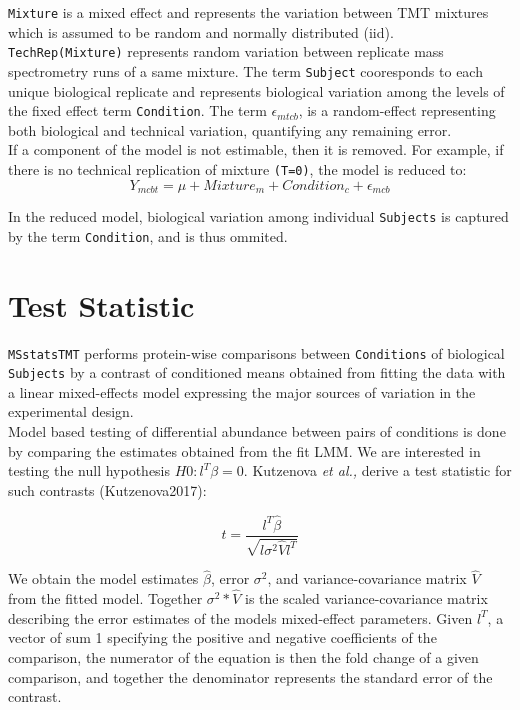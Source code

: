 \documentclass[11pt]{elife}\usepackage[]{graphicx}\usepackage[]{color}
\begin{document}
\texttt{Mixture} is a mixed effect and 
represents the variation between TMT mixtures which is assumed to be random 
and normally distributed (iid). \texttt{TechRep(Mixture)} represents random 
variation between replicate mass spectrometry runs of a same mixture. 
The term \texttt{Subject} cooresponds to each unique biological replicate and 
represents biological variation among the levels of the fixed effect term
\texttt{Condition}. The term $\epsilon_{mtcb}$,
is a random-effect representing both biological and technical variation, 
quantifying any remaining error.\\

If a component of the model is not estimable, then it is removed. 
For example, if there is no technical replication of mixture 
\texttt{(T=0)}, the model is reduced to: \\

\begin{equation} 
	Y_{mcbt} = \mu + Mixture_m + Condition_c + \epsilon_{mcb}
\end{equation}

In the reduced model, biological variation among individual \texttt{Subjects} is 
captured by the term \texttt{Condition}, and is thus ommited.\\


\section{Test Statistic}

\texttt{MSstatsTMT} performs protein-wise
comparisons between \texttt{Conditions} of biological \texttt{Subjects} by 
a contrast of conditioned means obtained from fitting the data with a
linear mixed-effects model expressing the major sources of variation in the
experimental design.\\

Model based testing of differential abundance between pairs of conditions
is done by comparing the estimates obtained from the fit LMM. We are interested 
in testing the null hypothesis $H0 : l^T\beta = 0$. Kutzenova \textit{et al.,}
derive a test statistic for such contrasts (Kutzenova2017):

\begin{equation}
	t = \frac{l^T \hat{\beta}}{\sqrt{l \sigma^2 \hat{V} l^T}}
\end{equation}

We obtain the model estimates $\hat{\beta}$, 
error $\sigma^2$, and
variance-covariance matrix $\hat{V}$ from the fitted model. 
Together $\sigma^2 * \hat{V}$ is the scaled variance-covariance matrix
describing the error estimates of the models mixed-effect parameters. 
Given $l^T$, a vector of sum 1 specifying the positive and negative
coefficients of the comparison, the numerator of the equation is then
the fold change of a given comparison, and together the denominator 
represents the standard error of the contrast.\\
\end{document}

